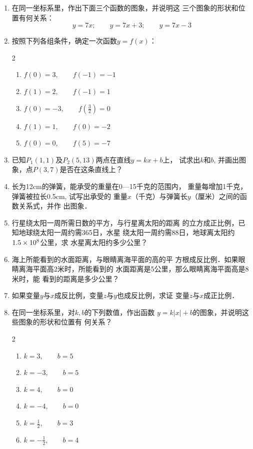 \begin{enumerate}
\item 在同一坐标系里，作出下面三个函数的图象，并说明这
三个图象的形状和位置有何关系：
\[y=7x;\qquad y=7x+3;\qquad y=7x-3\]
\item 
按照下列各组条件，确定一次函数$y=f(x)$：
\begin{multicols}{2}
\begin{enumerate}
    \item $f(0)=3,\qquad f(-1)=-1$
    \item $f(1)=2,\qquad f(-1)=1$
    \item $f(0)=-3,\qquad f\left(\frac{3}{2}\right)=0$
    \item $f(1)=1,\qquad f(0)=-2$
    \item $f(0)=0,\qquad f(5)=-7$
\end{enumerate}
\end{multicols}
\item 已知$P_1(1,1)$及$P_2(5,13)$两点在直线$y=kx+b$上，
试求出$k$和$b$, 并画出图象，点$P(3,7)$是否在这条直线上？
\item 长为12cm的弹簧，能承受的重量在0—15千克的范围内，
重量每增加1千克，弹簧被拉长0.5cm, 试写出承受的
重量$x$（千克）与弹簧长$y$（厘米）之间的函数关系式，并作
出图象．
\item 
行星绕太阳一周所需日数的平方，与行星离太阳的距离
的立方成正比例，已知地球绕太阳一周约需365日，水星
绕太阳一周约需88日，地球离太阳约$1.5\times10^8$公里，求
水星离太阳约多少公里？
\item 海上所能看到的水面距离，与眼睛离海平面的高的平
方根成反比例．如果眼睛离海平面高2米时，所能看到的
水面距离是5公里，那么眼睛离海平面高是8米时，能
看到的距离是多少公里？
\item 如果变量$y$与$x$成反比例，变量$z$与$y$也成反比例，求证
变量$z$与$x$成正比例．
\item 在同一坐标系里，对$k,b$的下列数值，作出函数
$y=k|x|+b$的图象，并说明这些图象的形状和位置有
何关系？
\begin{multicols}{2}
\begin{enumerate}
    \item $k=3,\qquad b=5$
    \item $k=-3,\qquad b=5$
    \item $k=4,\qquad b=0$
    \item $k=-4,\qquad b=0$
    \item $k=\frac{1}{2},\qquad b=3$
    \item $k=-\frac{1}{2},\qquad b=4$
\end{enumerate}
\end{multicols}

\end{enumerate}

